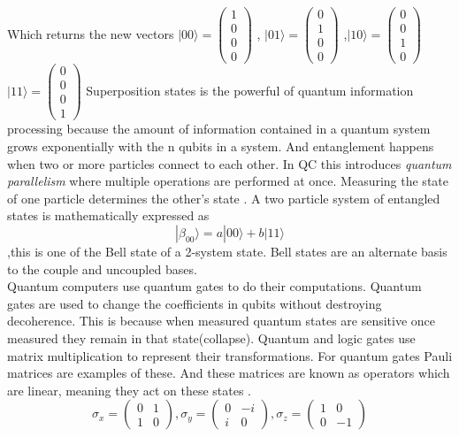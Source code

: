 \documentclass[15pt, a4paper]{Assignment}
\begin{document}
Which returns the new vectors $|00\rangle =	\begin{pmatrix}
	1\\0\\0\\0
\end{pmatrix}$ , $|01\rangle =	\begin{pmatrix}
0\\1\\0\\0
\end{pmatrix}$ ,$|10\rangle =	\begin{pmatrix}
0\\0\\1\\0
\end{pmatrix}$
$|11\rangle =	\begin{pmatrix}
	0\\0\\0\\1
\end{pmatrix}$
Superposition states is the powerful of quantum information processing because the 
amount of information contained in a quantum system grows exponentially with the n  qubits in a system.
And entanglement happens when two or more particles connect to each other.
In QC this introduces \textit{quantum parallelism} where multiple operations are performed at once.
Measuring the state of one particle determines the other's state \cite{mcintyre_quantum_2012}.
A two particle system of entangled states is mathematically expressed as \begin{equation}|\beta_{00} \rangle = a|00\rangle + b|11\rangle\end{equation}
,this is one of the Bell state of a 2-system state.
Bell states are an alternate basis to the couple and uncoupled bases\cite{mcintyre_quantum_2012}.\\
Quantum computers use quantum gates to do their computations\cite{AndrewSteane}.
Quantum gates are used to change the coefficients in qubits without destroying decoherence.
This is because when measured quantum states are sensitive once measured they remain in that state(collapse).
Quantum and logic gates use matrix multiplication to represent their transformations.
For quantum gates Pauli matrices are examples of these.
And these matrices are known as operators which are linear, meaning they act on these states \cite{AndrewSteane,mcintyre_quantum_2012}.
\begin{equation}
\sigma_x =\begin{pmatrix}
	0&1\\1&0
	\end{pmatrix},
	\sigma_y =\begin{pmatrix}
		0&-i\\i&0
	\end{pmatrix},\sigma_z =\begin{pmatrix}
	1&0\\0&-1
	\end{pmatrix}
\end{equation}
\end{document}

